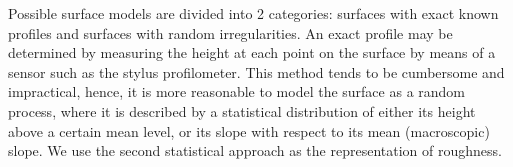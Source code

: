 Possible surface models are divided into 2 categories: surfaces with exact known profiles and surfaces with random irregularities. An exact profile may be determined by measuring the height at each point on the surface by means of a sensor such as the stylus profilometer. This method tends to be cumbersome and impractical, hence, it is more reasonable to model the surface as a random process, where it is described by a statistical distribution of either its height above a certain mean level, or its slope with respect to its mean (macroscopic) slope. We use the second statistical approach as the representation of roughness.







